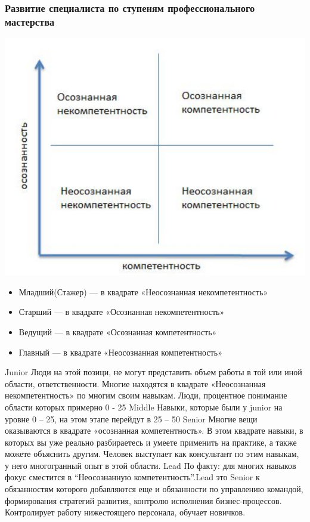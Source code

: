 \documentclass{../industrial-development}
\begin{document}
\begin{frame} \frametitle{Развитие  специалиста по ступеням профессионального мастерства}
 \centerline{\includegraphics[width=0.54\linewidth]{11-IT-specialist's-way/matrix.pdf}}
  \begin{itemize}
  \item Младший(Стажер) --- в квадрате «Неосознанная некомпетентность»
  \item Старший  --- в квадрате «Осознанная некомпетентность»
  \item Ведущий --- в квадрате «Осознанная компетентность»
 \item Главный --- в квадрате «Неосознанная компетентность»
  \end{itemize}
\end{frame}

\lecturenotes
Junior
Люди на этой позици, не могут представить объем работы в той или иной области, ответственности. Многие находятся в квадрате «Неосознанная некомпетентность» по многим своим навыкам. Люди, процентное понимание области которых примерно 0 - 25%
Middle 
Навыки, которые были у junior на уровне 0 – 25, на этом этапе перейдут в 25 – 50%
Senior
Многие вещи оказываются в квадрате «осознанная компетентность». В этом квадрате навыки, в которых вы уже реально разбираетесь и умеете применить на практике, а также можете объяснить другим. Человек выступает как консультант по этим навыкам, у него многогранный опыт в этой области.
Lead
По факту: для многих навыков фокус сместится в “Неосознанную компетентность”.Lead это Senior к обязанностям которого добавляются еще и обязанности по управлению командой, формирования стратегий развития, контролю исполнения бизнес-процессов. Контролирует работу нижестоящего персонала, обучает новичков.
\end{document}
